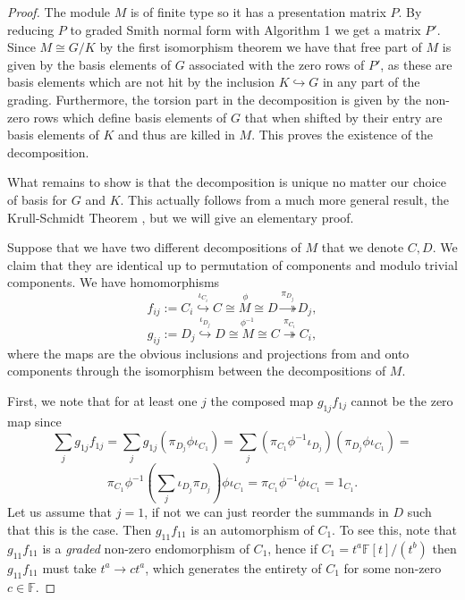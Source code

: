 \begin{proof}
  The module $M$ is of finite type so it has a presentation matrix $P$. By reducing $P$ to graded Smith normal form with Algorithm 1 we get a matrix $P'$. Since $M \cong G/K$ by the first isomorphism theorem we have that free part of $M$ is given by the basis elements of $G$ associated with the zero rows of $P'$, as these are basis elements which are not hit by the inclusion $K \hookrightarrow G$ in any part of the grading. Furthermore, the torsion part in the decomposition is given by the non-zero rows which define basis elements of $G$ that when shifted by their entry are basis elements of $K$ and thus are killed in $M$. This proves the existence of the decomposition.

  What remains to show is that the decomposition is unique no matter our choice of basis for $G$ and $K$. This actually follows from a much more general result, the Krull-Schmidt Theorem \cite[p. ~115]{jacobson2009basic}, but we will give an elementary proof.

  Suppose that we have two different decompositions of $M$ that we denote $C,D$. We claim that they are identical up to permutation of components and modulo trivial components. We have homomorphisms
  \[
    f_{ij} := C_{i} \overset{\iota_{C_{i}}}{\hookrightarrow} \overset{\phi}{C \cong M  \cong D}  \overset{\pi_{D_{j}}}{\twoheadrightarrow} D_{j},
  \]
\[
  g_{ij} := D_{j} \overset{\iota_{D_{j}}}{\hookrightarrow} \overset{\phi^{-1}}{D \cong M  \cong C}  \overset{\pi_{C_{i}}}{\twoheadrightarrow} C_{i},
  \]
  where the maps are the obvious inclusions and projections from and onto components through the isomorphism between the decompositions of $M$.

  First, we note that for at least one $j$ the composed map $g_{1j}f_{1j}$ cannot be the zero map since
\[\sum_j g_{1j} f_{1j} = \sum_{j} g_{1j} (\pi_{D_j} \phi \iota_{C_1}) = \sum_{j} (\pi_{C_1} \phi^{-1} \iota_{D_j}) (\pi_{D_j} \phi \iota_{C_1}) =\]
 \[\pi_{C_1} \phi^{-1} (\sum_{j} \iota_{D_j} \pi_{D_j}) \phi \iota_{C_1} = \pi_{C_1} \phi^{-1} \phi \iota_{C_1} = 1_{C_1}. \]
 Let us assume that $j=1$, if not we can just reorder the summands in $D$ such that this is the case. Then $g_{11}f_{11}$ is an automorphism of $C_{1}$. To see this, note that $g_{11}f_{11}$ is a \textit{graded} non-zero endomorphism of $C_{1}$, hence if $C_{1} = t^{a} \mathbb{F}[t] / (t^{b})$ then $g_{11}f_{11}$ must take $t^{a} \to c t^{a}$, which generates the entirety of $C_{1}$ for some non-zero $c \in \mathbb{F}$.


\end{proof}
